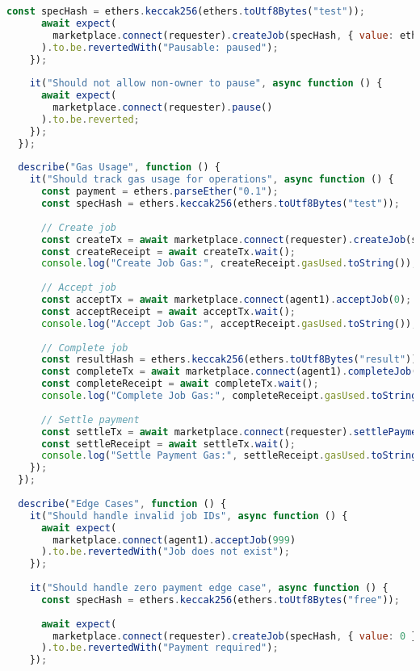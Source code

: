 \begin{lstlisting}[language=JavaScript,caption={Complete test suite for smart contracts}]
      const specHash = ethers.keccak256(ethers.toUtf8Bytes("test"));
      await expect(
        marketplace.connect(requester).createJob(specHash, { value: ethers.parseEther("1") })
      ).to.be.revertedWith("Pausable: paused");
    });
    
    it("Should not allow non-owner to pause", async function () {
      await expect(
        marketplace.connect(requester).pause()
      ).to.be.reverted;
    });
  });
  
  describe("Gas Usage", function () {
    it("Should track gas usage for operations", async function () {
      const payment = ethers.parseEther("0.1");
      const specHash = ethers.keccak256(ethers.toUtf8Bytes("test"));
      
      // Create job
      const createTx = await marketplace.connect(requester).createJob(specHash, { value: payment });
      const createReceipt = await createTx.wait();
      console.log("Create Job Gas:", createReceipt.gasUsed.toString());
      
      // Accept job
      const acceptTx = await marketplace.connect(agent1).acceptJob(0);
      const acceptReceipt = await acceptTx.wait();
      console.log("Accept Job Gas:", acceptReceipt.gasUsed.toString());
      
      // Complete job
      const resultHash = ethers.keccak256(ethers.toUtf8Bytes("result"));
      const completeTx = await marketplace.connect(agent1).completeJob(0, resultHash, "ipfs");
      const completeReceipt = await completeTx.wait();
      console.log("Complete Job Gas:", completeReceipt.gasUsed.toString());
      
      // Settle payment
      const settleTx = await marketplace.connect(requester).settlePayment(0);
      const settleReceipt = await settleTx.wait();
      console.log("Settle Payment Gas:", settleReceipt.gasUsed.toString());
    });
  });
  
  describe("Edge Cases", function () {
    it("Should handle invalid job IDs", async function () {
      await expect(
        marketplace.connect(agent1).acceptJob(999)
      ).to.be.revertedWith("Job does not exist");
    });
    
    it("Should handle zero payment edge case", async function () {
      const specHash = ethers.keccak256(ethers.toUtf8Bytes("free"));
      
      await expect(
        marketplace.connect(requester).createJob(specHash, { value: 0 })
      ).to.be.revertedWith("Payment required");
    });
    

\end{lstlisting}
